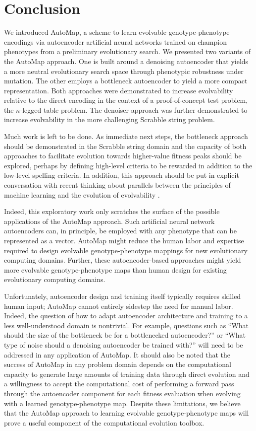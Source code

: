 \section{Conclusion} \label{sec:conclusion}

We introduced AutoMap, a scheme to learn evolvable genotype-phenotype encodings via autoencoder artificial neural networks trained on champion phenotypes from a preliminary evolutionary search.
We presented two variants of the AutoMap approach.
One is built around a denoising autoencoder that yields a more neutral evolutionary search space through phenotypic robustness under mutation.
The other employs a bottleneck autoencoder to yield a more compact representation.
Both approaches were demonstrated to increase evolvability relative to the direct encoding in the context of a proof-of-concept test problem, the $n$-legged table problem.
The denoiser approach was further demonstrated to increase evolvability in the more challenging Scrabble string problem.

Much work is left to be done.
As immediate next steps, the bottleneck approach should be demonstrated in the Scrabble string domain and the capacity of both approaches to facilitate evolution towards higher-value fitness peaks should be explored, perhaps by defining high-level criteria to be rewarded in addition to the low-level spelling criteria.
In addition, this approach should be put in explicit conversation with recent thinking about parallels between the principles of machine learning and the evolution of evolvability \cite{kouvaris2017evolution, watson2016can}.

Indeed, this exploratory work only scratches the surface of the possible applications of the AutoMap approach.
Such artificial neural network autoencoders can, in principle, be employed with any phenotype that can be represented as a vector.
AutoMap might reduce the human labor and expertise required to design evolvable genotype-phenotype mappings for new evolutionary computing domains.
Further, these autoencoder-based approaches might yield more evolvable genotype-phenotype maps than human design for existing evolutionary computing domains.

Unfortunately, autoencoder design and training itself typically requires skilled human input; AutoMap cannot entirely sidestep the need for manual labor.
Indeed, the question of how to adapt autoencoder architecture and training to a less well-understood domain is nontrivial.
For example, questions such as ``What should the size of the bottleneck be for a bottlenecked autoencoder?'' or ``What type of noise should a denoising autoencoder be trained with?'' will need to be addressed in any application of AutoMap.
It should also be noted that the success of AutoMap in any problem domain depends on the computational capacity to generate large amounts of training data through direct evolution and a willingness to accept the computational cost of performing a forward pass through the autoencoder component for each fitness evaluation when evolving with a learned genotype-phenotype map.
Despite these limitations, we believe that the AutoMap approach to learning evolvable genotype-phenotype maps will prove a useful component of the computational evolution toolbox.
